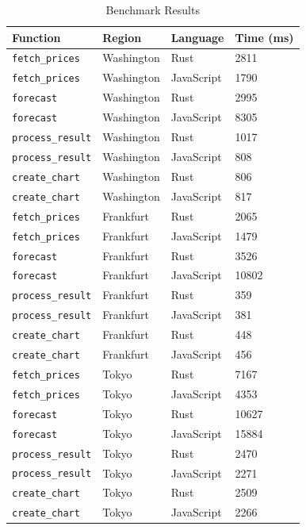 \begin{table}[h]
  \centering
  \begin{tabular}{|l|l|l|l|}
    \hline
    Function          & Region     & Language   & Time (ms) \\ \hline
    \texttt{fetch\_prices}   & Washington & Rust       & 2811      \\ \hline
    \texttt{fetch\_prices}   & Washington & JavaScript & 1790      \\ \hline
    \texttt{forecast}        & Washington & Rust       & 2995      \\ \hline
    \texttt{forecast}        & Washington & JavaScript & 8305      \\ \hline
    \texttt{process\_result} & Washington & Rust       & 1017      \\ \hline
    \texttt{process\_result} & Washington & JavaScript & 808       \\ \hline
    \texttt{create\_chart}   & Washington & Rust       & 806       \\ \hline
    \texttt{create\_chart}   & Washington & JavaScript & 817       \\ \hline
    \texttt{fetch\_prices}   & Frankfurt  & Rust       & 2065       \\ \hline
    \texttt{fetch\_prices}   & Frankfurt  & JavaScript & 1479       \\ \hline
    \texttt{forecast}        & Frankfurt  & Rust       & 3526       \\ \hline
    \texttt{forecast}        & Frankfurt  & JavaScript & 10802      \\ \hline
    \texttt{process\_result} & Frankfurt  & Rust       & 359        \\ \hline
    \texttt{process\_result} & Frankfurt  & JavaScript & 381        \\ \hline
    \texttt{create\_chart}   & Frankfurt  & Rust       & 448        \\ \hline
    \texttt{create\_chart}   & Frankfurt  & JavaScript & 456        \\ \hline
    \texttt{fetch\_prices}   & Tokyo      & Rust       & 7167       \\ \hline
    \texttt{fetch\_prices}   & Tokyo      & JavaScript & 4353       \\ \hline
    \texttt{forecast}        & Tokyo      & Rust       & 10627      \\ \hline
    \texttt{forecast}        & Tokyo      & JavaScript & 15884      \\ \hline
    \texttt{process\_result} & Tokyo      & Rust       & 2470       \\ \hline
    \texttt{process\_result} & Tokyo      & JavaScript & 2271       \\ \hline
    \texttt{create\_chart}   & Tokyo      & Rust       & 2509       \\ \hline
    \texttt{create\_chart}   & Tokyo      & JavaScript & 2266       \\ \hline
  \end{tabular}
  \caption{Benchmark Results}
  \label{tab:benchmark}
\end{table}

